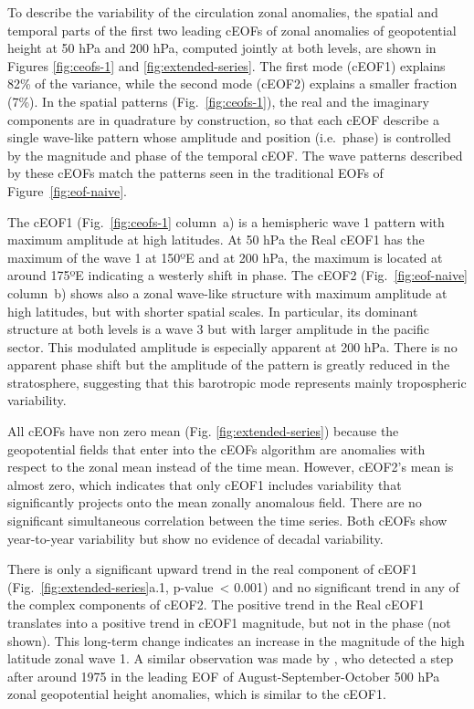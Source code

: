 \documentclass[smallextended]{svjour3}       %
\begin{document}
To describe the variability of the circulation zonal anomalies, the spatial and temporal parts of the first two leading cEOFs of zonal anomalies of geopotential height at 50 hPa and 200 hPa, computed jointly at both levels, are shown in Figures \ref{fig:ceofs-1} and \ref{fig:extended-series}.
The first mode (cEOF1) explains 82\% of the variance, while the second mode (cEOF2) explains a smaller fraction (7\%).
In the spatial patterns (Fig.~\ref{fig:ceofs-1}), the real and the imaginary components are in quadrature by construction, so that each cEOF describe a single wave-like pattern whose amplitude and position (i.e.~phase) is controlled by the magnitude and phase of the temporal cEOF.
The wave patterns described by these cEOFs match the patterns seen in the traditional EOFs of Figure~\ref{fig:eof-naive}.

The cEOF1 (Fig.~\ref{fig:ceofs-1} column~a) is a hemispheric wave 1 pattern with maximum amplitude at high latitudes.
At 50 hPa the Real cEOF1 has the maximum of the wave 1 at 150ºE and at 200 hPa, the maximum is located at around 175ºE indicating a westerly shift in phase.
The cEOF2 (Fig.~\ref{fig:eof-naive} column~b) shows also a zonal wave-like structure with maximum amplitude at high latitudes, but with shorter spatial scales.
In particular, its dominant structure at both levels is a wave 3 but with larger amplitude in the pacific sector.
This modulated amplitude is especially apparent at 200 hPa.
There is no apparent phase shift but the amplitude of the pattern is greatly reduced in the stratosphere, suggesting that this barotropic mode represents mainly tropospheric variability.

All cEOFs have non zero mean (Fig. \ref{fig:extended-series}) because the geopotential fields that enter into the cEOFs algorithm are anomalies with respect to the zonal mean instead of the time mean.
However, cEOF2's mean is almost zero, which indicates that only cEOF1 includes variability that significantly projects onto the mean zonally anomalous field.
There are no significant simultaneous correlation between the time series.
Both cEOFs show year-to-year variability but show no evidence of decadal variability.

There is only a significant upward trend in the real component of cEOF1 (Fig.~\ref{fig:extended-series}a.1, p-value~\textless{} 0.001) and no significant trend in any of the complex components of cEOF2.
The positive trend in the Real cEOF1 translates into a positive trend in cEOF1 magnitude, but not in the phase (not shown).
This long-term change indicates an increase in the magnitude of the high latitude zonal wave 1.
A similar observation was made by \citet{raphael2003}, who detected a step after around 1975 in the leading EOF of August-September-October 500 hPa zonal geopotential height anomalies, which is similar to the cEOF1.
\end{document}
